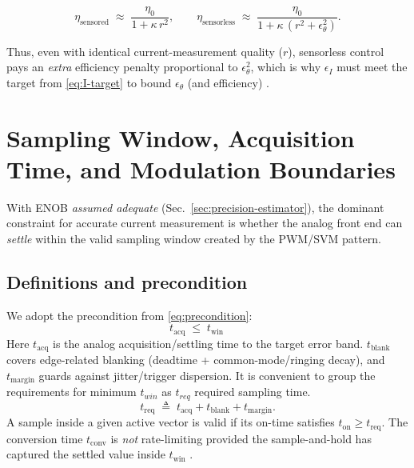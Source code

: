 \documentclass[conference]{IEEEtran}
\begin{document}
\begin{equation}
\eta_{\text{sensored}} \;\approx\; \frac{\eta_0}{1+\kappa\,r^2},\qquad
\eta_{\text{sensorless}} \;\approx\; \frac{\eta_0}{1+\kappa\,(r^2+\epsilon_\theta^2)} .
\end{equation}

Thus, even with identical current-measurement quality (\(r\)), sensorless control pays an \emph{extra} efficiency penalty proportional to \(\epsilon_\theta^2\), which is why \(\epsilon_I\) must meet the target from \eqref{eq:I-target} to bound \(\epsilon_\theta\) (and efficiency) \cite{Vas1998,Holtz2002}.



\section{Sampling Window, Acquisition Time, and Modulation Boundaries}
\label{sec:sampling-window}

With ENOB \emph{assumed adequate} (Sec.~\ref{sec:precision-estimator}), the dominant constraint for accurate current measurement is whether the analog front end can \emph{settle} within the valid sampling window created by the PWM/SVM pattern.

\subsection{Definitions and precondition}
We adopt the precondition from \eqref{eq:precondition}:
\begin{equation}
  \boxed{\, t_{\mathrm{acq}} \;\le\; t_{\mathrm{win}} \,} \qquad
\end{equation}
Here \(t_{\mathrm{acq}}\) is the analog acquisition/settling time to the target error band. \(t_{\mathrm{blank}}\) covers edge-related blanking (deadtime + common-mode/ringing decay), and \(t_{\mathrm{margin}}\) guards against jitter/trigger dispersion. It is convenient to group the requirements for minimum $t_{win}$ as $t_{req}$ required sampling time.
\begin{equation}
  t_{\mathrm{req}} \;\triangleq\; t_{\mathrm{acq}} + t_{\mathrm{blank}} + t_{\mathrm{margin}}.
  \label{eq:treq}
\end{equation}
A sample inside a given active vector is valid if its on-time satisfies \(t_{\mathrm{on}} \ge t_{\mathrm{req}}\). The conversion time \(t_{\mathrm{conv}}\) is \emph{not} rate-limiting provided the sample-and-hold has captured the settled value inside \(t_{\mathrm{win}}\) \cite{Kester2005,Bose2002}.
\end{document}
